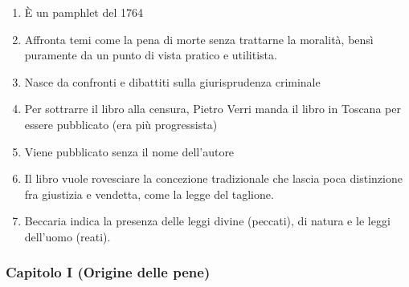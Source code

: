 \documentclass{article}
\begin{document}
\begin{enumerate}
    \item È un pamphlet del 1764
    \item Affronta temi come la pena di morte senza trattarne la moralità, bensì puramente da un punto di vista pratico e utilitista.
    \item Nasce da confronti e dibattiti sulla giurisprudenza criminale
    \item Per sottrarre il libro alla censura, Pietro Verri manda il libro in Toscana per essere pubblicato (era più progressista)
    \item Viene pubblicato senza il nome dell'autore
    \item Il libro vuole rovesciare la concezione tradizionale che lascia poca distinzione fra giustizia e vendetta, come la legge del taglione.
    \item Beccaria indica la presenza delle leggi divine (peccati), di natura e le leggi dell'uomo (reati).
\end{enumerate}

\subsubsection{Capitolo I (Origine delle pene)}
\end{document}
